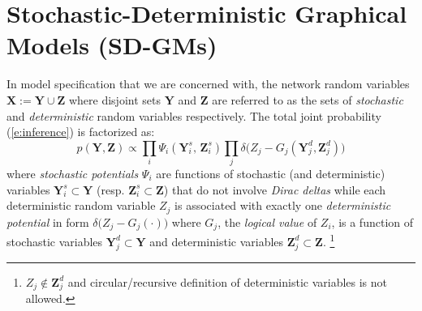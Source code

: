 \documentclass{article}
\newcommand{\bvec}[1]{\textbf{#1}}
\newcommand{\pr}{p}
\begin{document}
\section{Stochastic-Deterministic Graphical Models (SD-GMs)}
\label{sect:contribution1}
In model specification that we are concerned with,
the network random variables $\bvec{X} := \bvec{Y} \cup \bvec{Z}$
where disjoint sets $\bvec{Y}$ and $\bvec{Z}$ are referred to as the sets of \emph{stochastic} and \emph{deterministic}  random variables respectively. 
The total joint probability (\ref{e:inference}) is factorized as:
\begin{equation}
\label{e:infer.sd}
\pr(\bvec{Y}, \bvec{Z}) \propto 
\prod_{i} \Psi_i (\bvec{Y}^s_i, \, \bvec{Z}^s_i)
\prod_j \delta \big(
Z_j - G_j(\bvec{Y}^d_j, \bvec{Z}^d_j)
\big)
\end{equation}
where \emph{stochastic potentials} $\Psi_i$ are functions 
of stochastic (and deterministic) variables 
$\bvec{Y}^s_i \subset \bvec{Y}$ 
(resp. $\bvec{Z}^s_i \subset \bvec{Z}$) that do not involve 
\emph{Dirac deltas} while 
each deterministic random variable $Z_j$ 
is associated with exactly one 
\emph{deterministic potential} in form 
$\delta\big( Z_j - G_j(\cdot) \big)$ 
 where 
$G_j$, the \emph{logical value} of $Z_i$,  is a function of 
stochastic variables $\bvec{Y}_j^d \subset \bvec{Y}$ and deterministic variables $\bvec{Z}_j^d \subset \bvec{Z}$. 
\footnote{
$Z_j \not \in \bvec{Z}_j^d$ 
and circular/recursive definition of deterministic variables is not allowed. }
\end{document}
